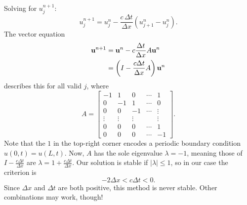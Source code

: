 \documentclass[../m180main.tex]{subfiles}
\begin{document}
Solving for $u_j^{n+1}$:
\[ u_j^{n+1} = u_j^n - \frac{c \,\Delta t}{\Delta x} \left( u_{j+1}^n - u_j^n \right). \]
The vector equation
\begin{align*}
    \mathbf{u}^{n+1} &= \mathbf{u}^n - c \frac{\Delta t}{\Delta x} A \mathbf{u}^n \\
    &= \left( I - \frac{c \Delta t}{\Delta x} A \right) \mathbf{u}^n
\end{align*}
describes this for all valid $j$, where
\[ A = \begin{bmatrix} -1 & 1 & 0 & \cdots & 1 \\ 0 & -1 & 1 & \cdots & 0 \\ 0 & 0 & -1 & \cdots & \vdots \\ \vdots & \vdots & \vdots & & \vdots \\ 0 & 0 & 0 & \cdots & 1 \\ 0 & 0 & 0 & \cdots & -1 \end{bmatrix}. \]
Note that the $1$ in the top-right corner encodes a periodic boundary condition $u(0,t) = u(L,t)$.
Now, $A$ has the sole eigenvalue $\lambda = -1$, meaning those of $I - \frac{c \Delta t}{\Delta x}$ are $\lambda = 1 + \frac{c \Delta t}{\Delta x}$.
Our solution is stable if $|\lambda| \leq 1$, so in our case the criterion is
\[ -2 \Delta x < c \Delta t < 0. \]
Since $\Delta x$ and $\Delta t$ are both positive, this method is never stable.
Other combinations may work, though!
\end{document}

